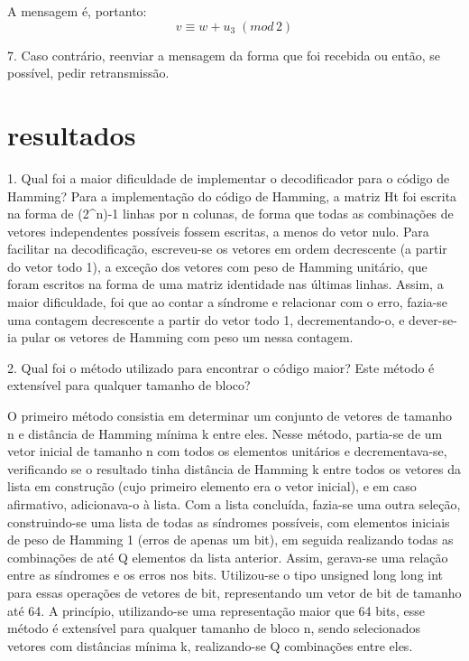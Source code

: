 \documentclass[%
aip,
jmp,%
amsmath,amssymb,
reprint,%
]{revtex4-1}
\begin{document}
	A mensagem é, portanto:
	\begin{equation}
	v \equiv w+u_3\; (mod\, 2)
	\end{equation}
	
	7. Caso contrário, reenviar a mensagem da forma que foi recebida ou então, se possível, pedir retransmissão.
	
	\section{resultados\label{sec:resultados}}
	
	1. Qual foi a maior dificuldade de implementar o decodificador para o código de Hamming?
	Para a implementação do código de Hamming, a matriz Ht foi escrita na forma de (2^n)-1 linhas por n colunas, de forma que todas as combinações de vetores independentes possíveis fossem escritas, a menos do vetor nulo. Para facilitar na decodificação, escreveu-se os vetores em ordem decrescente (a partir do vetor todo 1), a exceção dos vetores com peso de Hamming unitário, que foram escritos na forma de uma matriz identidade nas últimas linhas.
	Assim, a maior dificuldade, foi que ao contar a síndrome e relacionar com o erro, fazia-se uma contagem decrescente a partir do vetor todo 1, decrementando-o, e dever-se-ia pular os vetores de Hamming com peso um nessa contagem.
	
	2. Qual foi o método utilizado para encontrar o código maior? Este método é extensível para qualquer tamanho de bloco?
	
	O primeiro método consistia em determinar um conjunto de vetores de tamanho n e distância de Hamming mínima k entre eles. Nesse método, partia-se de um vetor inicial de tamanho n com todos os elementos unitários e decrementava-se, verificando se o resultado tinha distância de Hamming k entre todos os vetores da lista em construção (cujo primeiro elemento era o vetor inicial), e em caso afirmativo, adicionava-o à lista. Com a lista concluída, fazia-se uma outra seleção, construindo-se uma lista de todas as síndromes possíveis, com elementos iniciais de peso de Hamming 1 (erros de apenas um bit), em seguida realizando todas as combinações de até Q elementos da lista anterior. Assim, gerava-se uma relação entre as síndromes e os erros nos bits. 
	Utilizou-se o tipo unsigned long long int para essas operações de vetores de bit, representando um vetor de bit de tamanho até 64. A princípio, utilizando-se uma representação maior que 64 bits, esse método é extensível para qualquer tamanho de bloco n, sendo selecionados vetores com distâncias mínima k, realizando-se Q combinações entre eles. 
	
\end{document}
